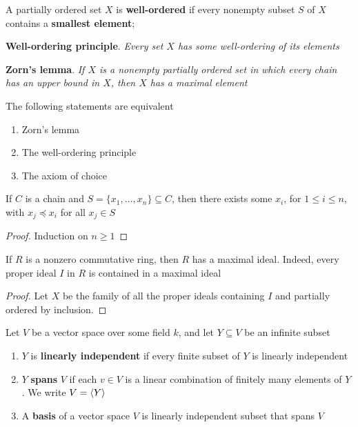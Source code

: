 \documentclass[11pt]{article}
\begin{document}
\begin{definition}[]
A partially ordered set \(X\) is \textbf{well-ordered} if every nonempty subset \(S\) of
\(X\) contains a \textbf{smallest element};
\end{definition}

\textbf{Well-ordering principle}. \hspace{0.1cm} \emph{Every set \(X\) has some well-ordering}
\emph{of its elements}


\textbf{Zorn's lemma}. \hspace{0.1cm} \emph{If \(X\) is a nonempty partially ordered set in}
\emph{which every chain has an upper bound in \(X\), then \(X\) has a maximal element}

\begin{theorem}[]
The following statements are equivalent
\begin{enumerate}
\item Zorn's lemma
\item The well-ordering principle
\item The axiom of choice
\end{enumerate}
\end{theorem}

\begin{proposition}[]
\label{prop6.45}
If \(C\) is a chain and \(S=\{x_1,\dots,x_n\}\subseteq C\), then there exists
some \(x_i\), for \(1\le i\le n\), with \(x_j\preceq x_i\) for all \(x_j\in S\)
\end{proposition}
\begin{proof}
Induction on \(n\ge1\)
\end{proof}

\begin{theorem}[]
\label{nthm5.43}
If \(R\) is a nonzero commutative ring, then \(R\) has a maximal ideal. Indeed,
every proper ideal \(I\) in \(R\) is contained in a maximal ideal
\end{theorem}

\begin{proof}
Let \(X\)  be the family of all the proper ideals containing \(I\) and
partially ordered by inclusion.
\end{proof}

\begin{definition}[]
Let \(V\) be a vector space over some field \(k\), and let \(Y\subseteq V\) be an
infinite subset 
\begin{enumerate}
\item \(Y\) is \textbf{linearly independent} if every finite subset of \(Y\) is linearly independent
\item \(Y\) \textbf{spans} \(V\) if each \(v\in V\) is a linear combination of finitely many
elements of \(Y\). We write \(V=\langle Y\rangle\)
\item A \textbf{basis} of a vector space \(V\) is linearly independent subset that spans \(V\)
\end{enumerate}
\end{definition}
\end{document}
